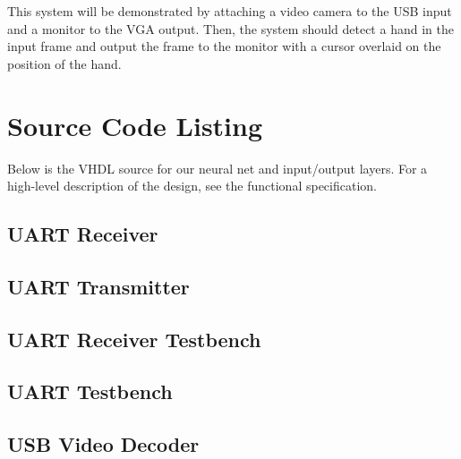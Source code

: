 \documentclass[10pt]{article}
\begin{document}
This system will be demonstrated by attaching a video camera to the USB input
and a monitor to the VGA output. Then, the system should detect a hand in the
input frame and output the frame to the monitor with a cursor overlaid on the
position of the hand.

\section{Source Code Listing}
\label{sec:source_code_listing}

Below is the VHDL source for our neural net and input/output layers. For a
high-level description of the design, see the functional specification.

\subsection{UART Receiver}
\label{sub:uart_receiver}



\subsection{UART Transmitter}
\label{sub:uart_transmitter}



\subsection{UART Receiver Testbench}
\label{sub:uart_receiver_testbench}



\subsection{UART Testbench}
\label{sub:uart_testbench}



\subsection{USB Video Decoder}
\label{sub:usb_video_decoder}


\end{document}
